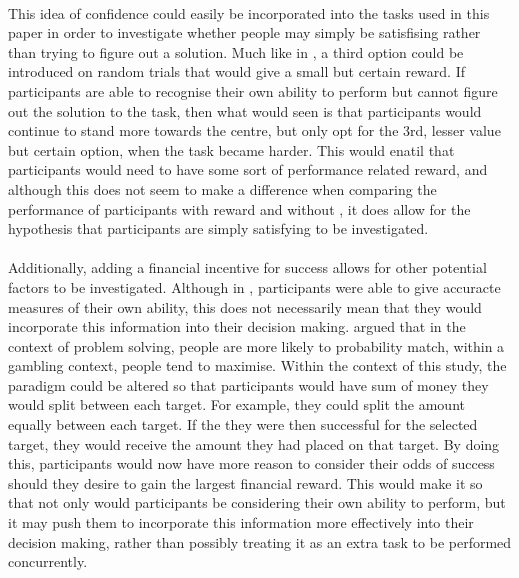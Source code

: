 \documentclass[12pt]{article}
\begin{document}
\paragraph{} This idea of confidence could easily be incorporated into the tasks used in this paper in order to investigate whether people may simply be satisfising rather than trying to figure out a solution. Much like in \cite{Kiani759}, a third option could be introduced on random trials that would give a small but certain reward. If participants are able to recognise their own ability to perform but cannot figure out the solution to the task, then what would seen is that participants would continue to stand more towards the centre, but only opt for the 3rd, lesser value but certain option, when the task became harder. This would enatil that participants would need to have some sort of performance related reward, and although this does not seem to make a difference when comparing the performance of participants with reward \citep{morvan2012human} and without \citep{clarke2015failure}, it does allow for the hypothesis that participants are simply satisfying to be investigated. %

\paragraph{} Additionally, adding a financial incentive for success allows for other potential factors to be investigated. Although in \cite{James2017}, participants were able to give accuracte measures of their own ability, this does not necessarily mean that they would incorporate this information into their decision making. \cite{Goodnow1955} argued that in the context of problem solving, people are more likely to probability match, within a gambling context, people tend to maximise. Within the context of this study, the paradigm could be altered so that participants would have sum of money they would split between each target. For example, they could split the amount equally between each target. If the they were then successful for the selected target, they would receive the amount they had placed on that target. By doing this, participants would now have more reason to consider their odds of success should they desire to gain the largest financial reward. This would make it so that not only would participants be considering their own ability to perform, but it may push them to incorporate this information more effectively into their decision making, rather than possibly treating it as an extra task to be performed concurrently.
\end{document}
